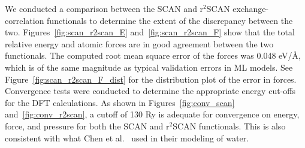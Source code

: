 We conducted a comparison between the SCAN and r$^2$SCAN exchange-correlation functionals to determine the extent of the discrepancy between the two. Figures~\ref{fig:scan_r2scan_E} and~\ref{fig:scan_r2scan_F} show that the total relative energy and atomic forces are in good agreement between the two functionals. The computed root mean square error of the forces was 0.048 \unit{eV/\angstrom}, which is of the same magnitude as typical validation errors in ML models. See Figure~\ref{fig:scan_r2scan_F_dist} for the distribution plot of the error in forces. Convergence tests were conducted to determine the appropriate energy cut-offs for the DFT calculations. As shown in Figures~\ref{fig:conv_scan} and~\ref{fig:conv_r2scan}, a cutoff of 130 Ry is adequate for convergence on energy, force, and pressure for both the SCAN and r$^2$SCAN functionals. This is also consistent with what Chen et al.~\cite{chen2017ab} used in their modeling of water.

